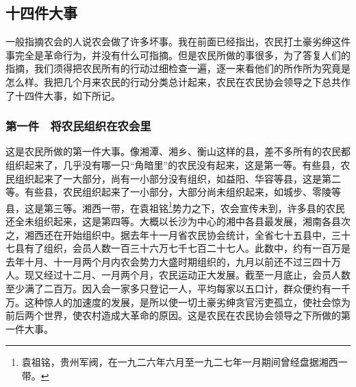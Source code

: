\documentclass[cn,11pt,chinese]{elegantbook}
\def\myformat#1{\hfil\hfil #1}
\begin{document}
\subsection*{\myformat{十四件大事}}
一般指摘农会的人说农会做了许多坏事。我在前面已经指出，农民打土豪劣绅这件事完全是革命行为，并没有什么可指摘。但是农民所做的事很多，为了答复人们的指摘，我们须得把农民所有的行动过细检查一遍，逐一来看他们的所作所为究竟是怎么样。我把几个月来农民的行动分类总计起来，农民在农民协会领导之下总共作了十四件大事，如下所记。\\
\subsubsection*{\myformat{第一件　将农民组织在农会里}}
这是农民所做的第一件大事。像湘潭、湘乡、衡山这样的县，差不多所有的农民都组织起来了，几乎没有哪一只“角暗里”的农民没有起来，这是第一等。有些县，农民组织起来了一大部分，尚有一小部分没有组织，如益阳、华容等县，这是第二等。有些县，农民组织起来了一小部分，大部分尚未组织起来，如城步、零陵等县，这是第三等。湘西一带，在袁祖铭\footnote[12]{ 袁祖铭，贵州军阀，在一九二六年六月至一九二七年一月期间曾经盘据湘西一带。}势力之下，农会宣传未到，许多县的农民还全未组织起来，这是第四等。大概以长沙为中心的湘中各县最发展，湘南各县次之，湘西还在开始组织中。据去年十一月省农民协会统计，全省七十五县中，三十七县有了组织，会员人数一百三十六万七千七百二十七人。此数中，约有一百万是去年十月、十一月两个月内农会势力大盛时期组织的，九月以前还不过三四十万人。现又经过十二月、一月两个月，农民运动正大发展。截至一月底止，会员人数至少满了二百万。因入会一家多只登记一人，平均每家以五口计，群众便约有一千万。这种惊人的加速度的发展，是所以使一切土豪劣绅贪官污吏孤立，使社会惊为前后两个世界，使农村造成大革命的原因。这是农民在农民协会领导之下所做的第一件大事。\\
\end{document}

